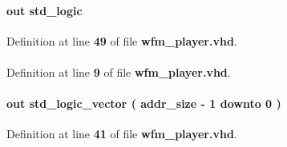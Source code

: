 \paragraph[{rcmd\+\_\+wr}]{ {\bfseries \textcolor{keywordflow}{out}\textcolor{vhdlchar}{ }} {\bfseries \textcolor{comment}{std\+\_\+logic}\textcolor{vhdlchar}{ }} \hspace{0.3cm}{\ttfamily [Port]}}\label{classwfm__player_a78c146778b35c788b7e41856e7e660a2}


Definition at line {\bf 49} of file {\bf wfm\+\_\+player.\+vhd}.

\paragraph[{std\+\_\+logic\+\_\+1164}]{\hspace{0.3cm}{\ttfamily [Package]}}\label{classwfm__player_acd03516902501cd1c7296a98e22c6fcb}


Definition at line {\bf 9} of file {\bf wfm\+\_\+player.\+vhd}.

\paragraph[{wcmd\+\_\+addr}]{ {\bfseries \textcolor{keywordflow}{out}\textcolor{vhdlchar}{ }} {\bfseries \textcolor{comment}{std\+\_\+logic\+\_\+vector}\textcolor{vhdlchar}{ }\textcolor{vhdlchar}{(}\textcolor{vhdlchar}{ }\textcolor{vhdlchar}{ }\textcolor{vhdlchar}{ }\textcolor{vhdlchar}{ }{\bfseries {\bf addr\+\_\+size}} \textcolor{vhdlchar}{-\/}\textcolor{vhdlchar}{ } \textcolor{vhdldigit}{1} \textcolor{vhdlchar}{ }\textcolor{keywordflow}{downto}\textcolor{vhdlchar}{ }\textcolor{vhdlchar}{ } \textcolor{vhdldigit}{0} \textcolor{vhdlchar}{ }\textcolor{vhdlchar}{)}\textcolor{vhdlchar}{ }} \hspace{0.3cm}{\ttfamily [Port]}}\label{classwfm__player_a568737a9dcb2ce886d8ce457fc64ae13}


Definition at line {\bf 41} of file {\bf wfm\+\_\+player.\+vhd}.

